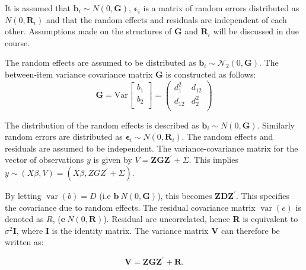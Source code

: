 \documentclass[12pt, a4paper]{report}
\theoremstyle{definition}
\theoremstyle{remark}
\begin{document}
It is assumed that $\boldsymbol{b}_i \sim N(0,\boldsymbol{G})$, $\boldsymbol{\epsilon}_i$ is a matrix of random errors distributed as $N(0,\boldsymbol{R}_i)$ and that the random effects and residuals are independent of each other. Assumptions made on the structures of $\boldsymbol{G}$ and $\boldsymbol{R}_i$ will be discussed in due course.

The random effects are assumed to be distributed as $\boldsymbol{b}_i \sim \mathcal{N}_2(0,\boldsymbol{G})$. The between-item variance covariance matrix $\boldsymbol{G}$ is constructed as follows:
\[ \boldsymbol{G} = \mbox{Var}  \left[
\begin{array}{c}
b_1   \\
b_2  \\
\end{array}
\right] =  \left(
\begin{array}{cc}
d^2_1  & d_{12} \\
d_{12} & d^2_2 \\
\end{array}
\right) \]



The distribution of the random effects is described as $\boldsymbol{b}_i \sim N(0,\boldsymbol{G})$. Similarly random errors are distributed as $\boldsymbol{\epsilon}_i \sim N(0,\boldsymbol{R}_i)$. The random effects and residuals are assumed to be independent. The variance-covariance matrix for the vector of observations $y$ is given by $V = \boldsymbol{ZGZ}^{\prime}+ \Sigma.$ This implies $y \sim(X\beta, V) = (X\beta,ZGZ^{\prime}+ \Sigma)$. 


By letting $\operatorname{var}(b) = D$ (i.e $\textbf{b} ~ N(0,\textbf{G})$), this becomes $\boldsymbol{ZDZ}^{\prime}$. This specifies the covariance due to random
effects. The residual covariance matrix $\operatorname{var}(e)$ is denoted as $R$, ($\textbf{e} ~ N(0,\textbf{R})$). Residual are uncorrelated,
hence \textbf{R} is equivalent to $\sigma^{2}$\textbf{I}, where \textbf{I} is the identity matrix. The variance matrix \textbf{V}
can therefore be written as:

\begin{equation}
\textbf{V}  = \textbf{ZGZ}^{\prime} + \textbf{R}.
\end{equation}
\end{document}
